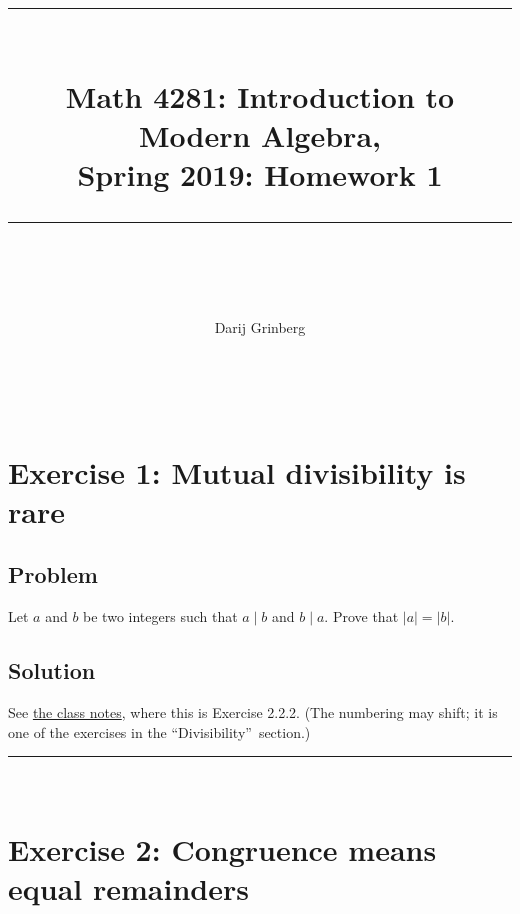 \documentclass[paper=a4, fontsize=12pt]{scrartcl}%
\theoremstyle{plainsl}
\theoremstyle{definition}
\theoremstyle{remark}
\begin{document}
\title{ \\[25pt] \rule{\linewidth}{0.5pt} \\[0.4cm] {\huge Math 4281: Introduction to Modern Algebra, }\\Spring 2019: Homework 1\\\rule{\linewidth}{2pt} \\[0.5cm] }
\author{Darij Grinberg}
\maketitle

\rule{0pt}{0.3pt} \\[0.4cm]

\section{Exercise 1: Mutual divisibility is rare}

\subsection{Problem}

Let $a$ and $b$ be two integers such that $a \mid b$ and $b \mid a$. Prove
that $\left|  a \right|  = \left|  b \right|  $.

\subsection{Solution}

See \href{http://www.cip.ifi.lmu.de/~grinberg/t/19s/notes.pdf}{the class
notes}, where this is Exercise 2.2.2. (The numbering may shift; it is one of
the exercises in the \textquotedblleft Divisibility\textquotedblright\ section.)

\rule{\linewidth}{0.3pt} \\[0.4cm]

\section{Exercise 2: Congruence means equal remainders}
\end{document}
